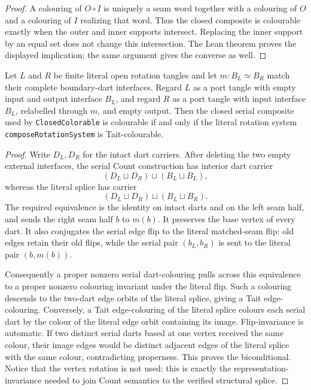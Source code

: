 \begin{proof}
A colouring of \(O\circ I\) is uniquely a seam word together with a
colouring of \(O\) and a colouring of \(I\) realizing that word.  Thus the
closed composite is colourable exactly when the outer and inner supports
intersect.  Replacing the inner support by an equal set does not change this
intersection.  The Lean theorem proves the displayed implication; the same
argument gives the converse as well.
\end{proof}

\begin{theorem}
\label{thm:physical-closed-count-bridge}
Let \(L\) and \(R\) be finite literal open rotation tangles and let
\(m:B_L\simeq B_R\) match their complete boundary-dart interfaces.  Regard
\(L\) as a port tangle with empty input and output interface \(B_L\), and
regard \(R\) as a port tangle with input interface \(B_L\), relabelled through
\(m\), and empty output.  Then the closed serial composite used by
\texttt{ClosedColorable} is colourable if and only if the literal rotation
system \texttt{composeRotationSystem} is Tait-colourable.
\end{theorem}

\begin{proof}
Write \(D_L,D_R\) for the intact dart carriers.  After deleting the two empty
external interfaces, the serial Count construction has interior dart carrier
\[
              (D_L\sqcup D_R)\sqcup(B_L\sqcup B_L),
\]
whereas the literal splice has carrier
\[
              (D_L\sqcup D_R)\sqcup(B_L\sqcup B_R).
\]
The required equivalence is the identity on intact darts and on the left seam
half, and sends the right seam half \(b\) to \(m(b)\).  It preserves the base
vertex of every dart.  It also conjugates the serial edge flip to the literal
matched-seam flip: old edges retain their old flips, while the serial pair
\((b_L,b_R)\) is sent to the literal pair \((b,m(b))\).

Consequently a proper nonzero serial dart-colouring pulls across this
equivalence to a proper nonzero colouring invariant under the literal flip.
Such a colouring descends to the two-dart edge orbits of the literal splice,
giving a Tait edge-colouring.  Conversely, a Tait edge-colouring of the
literal splice colours each serial dart by the colour of the literal edge
orbit containing its image.  Flip-invariance is automatic.  If two distinct
serial darts based at one vertex received the same colour, their image edges
would be distinct adjacent edges of the literal splice with the same colour,
contradicting properness.  This proves the biconditional.  Notice that the
vertex rotation is not used: this is exactly the representation-invariance
needed to join Count semantics to the verified structural splice.
\end{proof}


